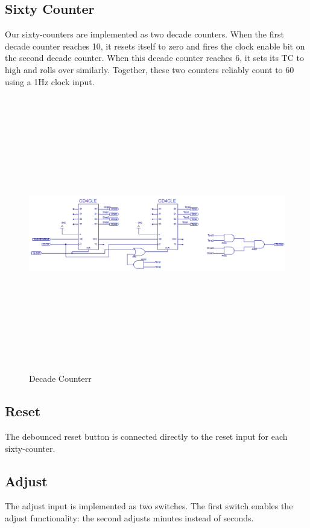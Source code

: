 \documentclass[paper=letter, fontsize=11pt]{scrartcl}
\begin{document}
\subsection{Sixty Counter}
Our sixty-counters are implemented as two decade counters. When the first decade counter reaches 10, it resets itself to zero and fires the clock enable bit on the second decade counter. When this decade counter reaches 6, it sets its TC to high and rolls over similarly. Together, these two counters reliably count to 60 using a 1Hz clock input.

\begin{figure}[H]
\includegraphics[height=120mm]{decadecounter.PNG}
\centering
\caption{Decade Counterr}
\label{overflow}
\end{figure}

\subsection{Reset}
The debounced reset button is connected directly to the reset input for each sixty-counter.

\subsection{Adjust}
The adjust input is implemented as two switches. The first switch enables the adjust functionality: the second adjusts minutes instead of seconds.
\end{document}

